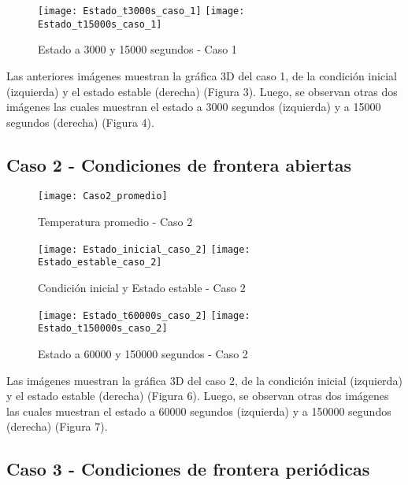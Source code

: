 \documentclass{article}
\begin{document}
\begin{figure}[h!]
\centering
\texttt{[image: Estado\_t3000s\_caso\_1]}
\texttt{[image: Estado\_t15000s\_caso\_1]}
\caption{Estado a 3000 y 15000 segundos - Caso 1}
\label{Est3000}
\end{figure}

\vspace{3mm}

Las anteriores imágenes muestran la gráfica 3D del caso 1, de la condición inicial (izquierda) y el estado estable (derecha) (Figura 3). Luego, se observan otras dos imágenes las cuales muestran el estado a 3000 segundos (izquierda) y a 15000 segundos (derecha) (Figura 4).


\subsection{Caso 2 - Condiciones de frontera abiertas}

\begin{figure}[h!]
\centering
\texttt{[image: Caso2\_promedio]}
\caption{Temperatura promedio - Caso 2}
\label{temp2}
\end{figure}


\begin{figure}[h!]
\centering
\texttt{[image: Estado\_inicial\_caso\_2]}
\texttt{[image: Estado\_estable\_caso\_2]}
\caption{Condición inicial y Estado estable - Caso 2}
\label{cond2}
\end{figure}

\begin{figure}[h!]
\centering
\texttt{[image: Estado\_t60000s\_caso\_2]}
\texttt{[image: Estado\_t150000s\_caso\_2]}
\caption{Estado a 60000 y 150000 segundos - Caso 2}
\label{Est2}
\end{figure}

\vspace{3mm}
Las imágenes muestran la gráfica 3D del caso 2, de la condición inicial (izquierda) y el estado estable (derecha) (Figura 6). Luego, se observan otras dos imágenes las cuales muestran el estado a 60000 segundos (izquierda) y a 150000 segundos (derecha) (Figura 7).


\newpage

\subsection{Caso 3 - Condiciones de frontera periódicas}
\end{document}
